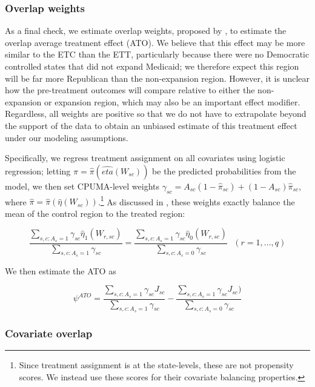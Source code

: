 \subsubsection{Overlap weights}

As a final check, we estimate overlap weights, proposed by \cite{li2018balancing}, to estimate the overlap average treatment effect (ATO). We believe that this effect may be more similar to the ETC than the ETT, particularly because there were no Democratic controlled states that did not expand Medicaid; we therefore expect this region will be far more Republican than the non-expansion region. However, it is unclear how the pre-treatment outcomes will compare relative to either the non-expansion or expansion region, which may also be an important effect modifier. Regardless, all weights are positive so that we do not have to extrapolate beyond the support of the data to obtain an unbiased estimate of this treatment effect under our modeling assumptions. 

Specifically, we regress treatment assignment on all covariates using logistic regression; letting $\hat{\pi} = \hat{\pi}(\hat{eta}(W_{sc}))$ be the predicted probabilities from the model, we then set CPUMA-level weights $\gamma_{sc} = A_{sc}(1 - \hat{\pi}_{sc}) + (1 - A_{sc})\hat{\pi}_{sc}$, where $\hat{\pi} = \hat{\pi}(\hat{\eta}(W_{sc}))$.\footnote{Since treatment assignment is at the state-levels, these are not propensity scores. We instead use these scores for their covariate balancing properties.} As discussed in \cite{li2018balancing}, these weights exactly balance the mean of the control region to the treated region:

\begin{equation}
    \frac{\sum_{s, c: A_s = 1} \gamma_{sc}\hat{\eta}_1(W_{r, sc})}{\sum_{s, c: A_s = 1}\gamma_{sc}} = \frac{\sum_{s, c: A_s = 1}\gamma_{sc}\hat{\eta}_0(W_{r, sc})}{\sum_{s, c: A_s = 0}\gamma_{sc}} \ \ \ (r = 1, ..., q)
\end{equation}

We then estimate the ATO as

\begin{equation}
    \psi^{ATO} = \frac{\sum_{s, c: A_s = 1} \gamma_{sc}J_{sc}}{\sum_{s, c: A_s = 1}\gamma_{sc}} - \frac{\sum_{s, c: A_s = 1}\gamma_{sc}J_{sc})}{\sum_{s, c: A_s = 0}\gamma_{sc}}
\end{equation}


\subsubsection{Covariate overlap}

